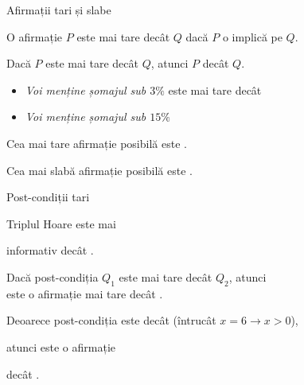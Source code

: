 \begin{frame}{Afirmații tari și slabe}

O afirmație $P$ este \alert{mai tare} decât $Q$ dacă \alert{$P$ o implică pe $Q$}.

Dacă $P$ este mai tare decât $Q$, atunci $P$  decât $Q$.

\pause
\begin{example}
\begin{itemize}
	\item {\em Voi menține șomajul sub $3\%$} este \alert{mai tare} decât
	\item {\em Voi menține șomajul sub $15\%$}	
\end{itemize}
\end{example}

\pause
\alert{Cea mai tare} afirmație posibilă este \intens{$\bot$}.


\alert{Cea mai slabă} afirmație posibilă este \intens{$\top$}.

\end{frame}

\begin{frame}{Post-condiții tari}

\begin{example}
Triplul Hoare  este mai

informativ decât .
\end{example}

\medskip \pause
Dacă \alert{post-condiția} $Q_1$ este \alert{mai tare} decât $Q_2$, atunci \\  este o afirmație \alert{mai tare} decât .

\medskip \pause
\begin{example}
Deoarece post-condiția  este  decât  (întrucât $x = 6 \to x > 0$),

atunci  este o afirmație  

decât . 
\end{example}
\end{frame}


